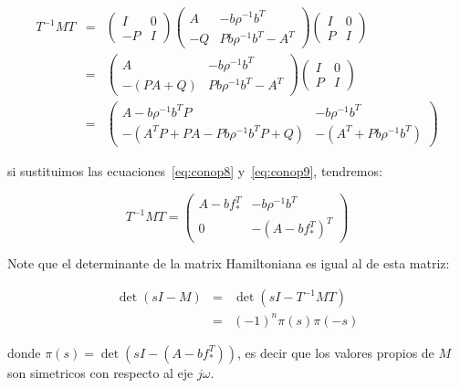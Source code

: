             \begin{eqnarray*}
                T^{-1} M T & = &
                \begin{pmatrix}
                    I & 0 \\
                    -P & I
                \end{pmatrix}
                \begin{pmatrix}
                    A & -b \rho^{-1} b^T \\
                    -Q & P b \rho^{-1} b^T - A^T
                \end{pmatrix}
                \begin{pmatrix}
                    I & 0 \\
                    P & I
                \end{pmatrix} \\
                & = &
                \begin{pmatrix}
                    A & -b \rho^{-1} b^T \\
                    -(PA + Q) & P b \rho^{-1} b^T - A^T
                \end{pmatrix}
                \begin{pmatrix}
                    I & 0 \\
                    P & I
                \end{pmatrix} \\
                & = &
                \begin{pmatrix}
                    A - b \rho^{-1} b^T P & -b \rho^{-1} b^T \\
                    -(A^TP + PA - Pb \rho^{-1} b^T P + Q) & - (A^T + P b \rho^{-1} b^T)
                \end{pmatrix}
            \end{eqnarray*}

            si sustituimos las ecuaciones~\ref{eq:conop8} y~\ref{eq:conop9}, tendremos:

            \begin{equation*}
                T^{-1} M T =
                \begin{pmatrix}
                    A - b f_*^T & - b \rho^{-1} b^T \\
                    0 & -(A - b f_*^T)^T
                \end{pmatrix}
            \end{equation*}

            \begin{nota}
                Note que el determinante de la matrix Hamiltoniana es igual al de esta matriz:

                \begin{eqnarray*}
                    \det{(sI - M)} & = & \det{(sI - T^{-1}MT)} \\
                     & = & (-1)^n \pi(s) \pi(-s)
                \end{eqnarray*}

                donde $\pi(s) = \det{(sI - (A - b f_*^T))}$, es decir que los valores propios de $M$ son simetricos con respecto al eje $j\omega$.
            \end{nota}

